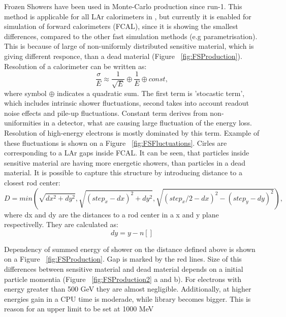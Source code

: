 Frozen Showers have been used in \atlas Monte-Carlo production since run-1. This method is applicable for all LAr calorimeters in \atlas, but currently it is enabled for simulation of forward calorimeters (FCAL), since it is showing the smallest differences, compared to the other fast simulation methods (e.g parametrisation). This is because of large of non-uniformly distributed sensitive material, which is giving different responce, than a dead material (Figure ~\ref{fig:FSProduction}). Resolution of a calorimeter can be written as:
\begin{equation}\label{eq:EMResoultion}
\frac{\sigma}{E} \approx \frac{1}{\sqrt{E}}	\oplus \frac{1}{E} 	\oplus const,
\end{equation}
where symbol $\oplus$ indicates a quadratic sum. The first term is 'stocastic term', which includes intrinsic shower fluctuations, second takes into account readout noise effects and pile-up fluctuations. Constant term derives from non-uniformities in a detector, what are causing large fluctuation of the energy loss. Resolution of high-energy electrons is mostly dominated by this term. Example of these fluctuations is shown on a Figure ~\ref{fig:FSFluctuations}. Cirles are corresponding to a LAr gaps inside FCAL. It can be seen, that particles inside sensitive material are having more energetic showers, than particles in a dead material. It is possible to capture this structure by introducing  distance to a closest rod center:
\begin{equation}
D = min(\sqrt{dx^2+dy^2}, \sqrt{(step_x-dx)^2+dy^2}, \sqrt{(step_x/2-dx)^2-(step_y-dy)^2}), 
\end{equation}
where dx and dy are the distances to a rod center in a x and y plane respectivelly. They are calculated as:
\begin{equation}
dy = y-n[]
\end{equation}

Dependency of summed energy of shower on the distance defined above is shown on a Figure ~\ref{fig:FSProduction}. Gap is marked by the red lines. Size of this differences between sensitive material and dead material depends on a initial particle momentia (Figure ~\ref{fig:FSProduction2} a and b). For electrons with energy greater than 500 GeV they are almost negligible. Additionally, at higher energies gain in a CPU time is moderade, while library becomes bigger. This is reason for an upper limit to be set at 1000 MeV
\begin{figure}
\end{figure}

